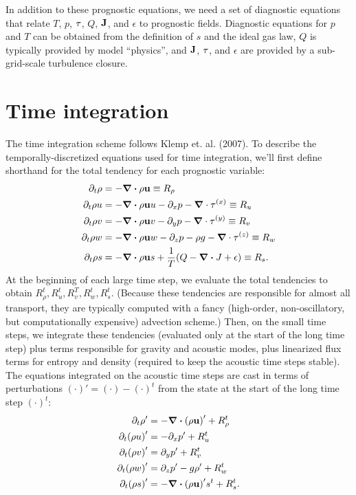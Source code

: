 \documentclass[11pt]{article}
\begin{document}
In addition to these prognostic equations, we need a set of diagnostic equations that relate $T$, $p$, ${\bf \tau}$, $Q$, ${\bf J}$, and $\epsilon$ to prognostic fields. Diagnostic equations for $p$ and $T$ can be obtained from the definition of $s$ and the ideal gas law, $Q$ is typically provided by model ``physics'', and ${\bf J}$, ${\bf \tau}$, and $\epsilon$ are provided by a sub-grid-scale turbulence closure.

\section{Time integration}

The time integration scheme follows Klemp et. al. (2007). To describe the temporally-discretized equations used for time integration, we'll first define shorthand for the total tendency for each prognostic variable:
\begin{align*}
\partial_t \rho &= -\div \rho {\bf u} \equiv R_\rho \\
\partial_t \rho u &= -\div \rho {\bf u} u -\partial_x p - \grad \cdot {\bf \tau}^{(x)} \equiv R_u\\
\partial_t \rho v &= -\div \rho {\bf u} v -\partial_y p - \grad \cdot {\bf \tau}^{(y)} \equiv R_v \\
\partial_t \rho w &= -\div \rho {\bf u} w -\partial_z p - \rho g - \grad \cdot {\bf \tau}^{(z)} \equiv R_w \\
\partial_t \rho s &= -\div \rho {\bf u} s + \frac{1}{T} \qty(Q - \div J + \epsilon) \equiv R_s.
\end{align*}
At the beginning of each large time step, we evaluate the total tendencies to obtain $R_{\rho}^t, R_u^t, R_v^T, R_w^t, R_s^t$. (Because these tendencies are responsible for almost all transport, they are typically computed with a fancy (high-order, non-oscillatory, but computationally expensive) advection scheme.) Then, on the small time steps, we integrate these tendencies (evaluated only at the start of the long time step) plus terms responsible for gravity and acoustic modes, plus linearized flux terms for entropy and density (required to keep the acoustic time steps stable). The equations integrated on the acoustic time steps are cast in terms of perturbations $(\cdot)' = (\cdot) - (\cdot)^t$ from the state at the start of the long time step $(\cdot)^t$:
\begin{align*}
\partial_t \rho' &= -\div \qty(\rho {\bf u})' + R_\rho^t \\
\partial_t \qty(\rho u)' &= -\partial_x p' + R_u^t \\
\partial_t \qty(\rho v)' &= \partial_y p' + R_v^t \\
\partial_t \qty(\rho w)' &= \partial_z p' - g \rho' + R_w^t \\
\partial_t \qty(\rho s)' &= -\div \qty(\rho {\bf u})' s^t + R_s^t.
\end{align*}
\end{document}
